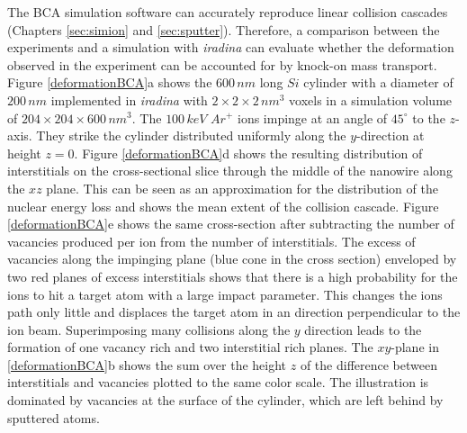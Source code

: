 The BCA simulation software can accurately reproduce linear collision cascades (Chapters \ref{sec:simion} and \ref{sec:sputter}). Therefore, a comparison between the experiments and a simulation with \emph{iradina} can evaluate whether the deformation observed in the experiment can be accounted for by knock-on mass transport. Figure \ref{deformationBCA}a shows the $600\,nm$ long $Si$ cylinder with a diameter of $200\,nm$ implemented in \emph{iradina} with $2\times2\times2\,nm^3$ voxels in a simulation volume of $204\times204\times600\,nm^3$. The $100\,keV\,\,Ar^+$ ions impinge at an angle of $45^\circ$ to the $z$-axis. They strike the cylinder distributed uniformly along the $y$-direction at height $z=0$. Figure \ref{deformationBCA}d shows the resulting distribution of interstitials on the cross-sectional slice through the middle of the nanowire along the $xz$ plane. This can be seen as an approximation for the distribution of the nuclear energy loss and shows the mean extent of the collision cascade. Figure \ref{deformationBCA}e shows the same cross-section after subtracting the number of vacancies produced per ion from the number of interstitials. The excess of vacancies along the impinging plane (blue cone in the cross section) enveloped by two red planes of excess interstitials shows that there is a high probability for the ions to hit a target atom with a large impact parameter. This changes the ions path only little and displaces the target atom in an direction perpendicular to the ion beam. Superimposing many collisions along the $y$ direction leads to the formation of one vacancy rich and two interstitial rich planes. The $xy$-plane in \ref{deformationBCA}b shows the sum over the height $z$ of the difference between interstitials and vacancies plotted to the same color scale. The illustration is dominated by vacancies at the surface of the cylinder, which are left behind by sputtered atoms. 

